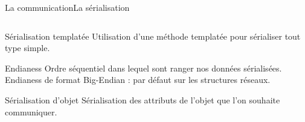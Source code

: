 \documentclass[french]{beamer}
\begin{document}
		\begin{frame}{La communication}{La sérialisation}
	        \begin{columns}
		        \begin{column}{0.65\textwidth}
			    	\begin{block}{Sérialisation templatée}
			            Utilisation d'une méthode templatée pour sérialiser tout type simple.

			        \end{block}
			        
			         \begin{block}{Endianess}
			            Ordre séquentiel dans lequel sont ranger nos données sérialisées.
			            \newline Endianess de format Big-Endian : par défaut sur les structures réseaux.
			        \end{block}

			       	\begin{block}{Sérialisation d'objet}
			            Sérialisation des attributs de l'objet que l'on souhaite communiquer.
			        \end{block}
				\end{column}


\end{columns}
\end{frame}
\end{document}
